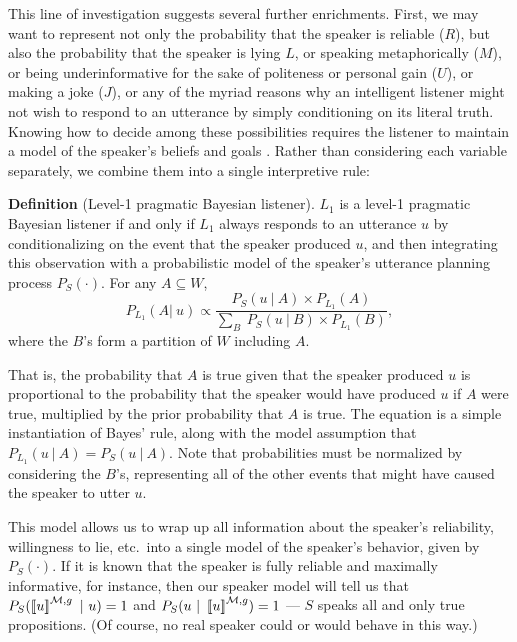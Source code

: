 \documentclass[12pt]{article}
\newcommand{\llbracket}{\ensuremath{\left [\!\left [}}%
\newcommand{\rrbracket}{\ensuremath{\right ]\!\right ]}}
\providecommand{\sv}[1]{\ensuremath{\llbracket #1 \rrbracket}}
\newcounter{definition}
\newcommand{\defin}[2]{
\vspace{.1in}
\noindent \textbf{Definition \arabic{definition}} (#1). #2
\vspace{.1in}
\addtocounter{definition}{1}
}
\begin{document}
This line of investigation suggests several further enrichments. First, we may want to represent not only the probability that the speaker is reliable ($R$), but also the probability that the speaker is lying $L$, or speaking metaphorically ($M$), or being underinformative for the sake of politeness or personal gain ($U$), or making a joke ($J$), or any of the myriad reasons why an intelligent listener might not wish to respond to an utterance by simply conditioning on its literal truth. Knowing how to decide among these possibilities requires the listener to maintain a model of the speaker's beliefs and goals \citep[][etc.]{grice89,lewis69,clark96}. Rather than considering each variable separately, we combine them into a single interpretive rule:

\defin{Level-1 pragmatic Bayesian listener}{$L_1$ is a level-1 pragmatic Bayesian listener if and only if $L_1$ always responds to an utterance $u$ by conditionalizing on the event that the speaker produced $u$, and then integrating this observation with a probabilistic model of the speaker's utterance planning process $P_{S}(\cdot)$. For any $A \subseteq W$, 
$$
P_{L_1}(A |\ u) \propto \frac{P_{S}(u \ |\ A) \times P_{L_1}(A)}{\sum_B\ P_{S}(u \ |\ B) \times P_{L_1}(B)},
$$
where the $B$'s form a partition of $W$ including $A$.

That is, the probability that $A$ is true given that the speaker produced $u$ is proportional to the probability that the speaker would have produced $u$ if $A$ were true, multiplied by the prior probability that $A$ is true. The equation is a simple instantiation of Bayes' rule, along with the model assumption that $P_{L_1}(u \ |\ A) = P_{S}(u \ |\ A)$. Note that probabilities must be normalized by considering the $B$'s, representing all of the other events that might have caused the speaker to utter $u$.
}

This model allows us to wrap up all information about the speaker's reliability, willingness to lie, etc.\ into a single model of the speaker's behavior, given by $P_{S}(\cdot)$. If it is known that the speaker is fully reliable and maximally informative, for instance, then our speaker model will tell us that $P_{S}(\sv{u}^{\mathcal{M},g} \ |\ u) = 1$ and $P_{S}(u\ |\ \sv{u}^{\mathcal{M},g}) = 1$ --- $S$ speaks all and only true propositions. (Of course, no real speaker could or would behave in this way.)

%
%

%
\end{document}
